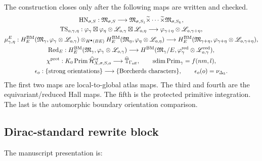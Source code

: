 The construction closes only after the following maps are written and
checked.
\[
\begin{gathered}
  \mathrm{HN}_{\sigma,S}:
  \mathfrak M_{\sigma,S}
  \longrightarrow
  \mathfrak M_{\sigma,S_1}\widetilde{\times}\cdots
  \widetilde{\times}\mathfrak M_{\sigma,S_k},\\
  \mathrm{TS}_{o,\gamma,\eta}:
  \varphi_{\gamma}\boxtimes\varphi_{\eta}\otimes
  \mathscr L_{o,\gamma}\boxtimes\mathscr L_{o,\eta}
  \longrightarrow
  \varphi_{\gamma+\eta}\otimes\mathscr L_{o,\gamma+\eta},\\
  \mu^{E}_{\gamma,\eta}:
  H^{\operatorname{BM}}_{E}(\mathfrak M_\gamma,\varphi_\gamma\otimes\mathscr L_{o,\gamma})
  \otimes_{H^\bullet(BE)}
  H^{\operatorname{BM}}_{E}(\mathfrak M_\eta,\varphi_\eta\otimes\mathscr L_{o,\eta})
  \longrightarrow
  H^{\operatorname{BM}}_{E}(\mathfrak M_{\gamma+\eta},
  \varphi_{\gamma+\eta}\otimes\mathscr L_{o,\gamma+\eta}),\\
  \mathrm{Red}_E:
  H^{\operatorname{BM}}_{E}(\mathfrak M_\gamma,\varphi_\gamma\otimes\mathscr L_{o,\gamma})
  \longrightarrow
  H^{\operatorname{BM}}(\mathfrak M_\gamma/E,
  \varphi_\gamma^{\mathrm{red}}\otimes\mathscr L_{o,\gamma}^{\mathrm{red}}),\\
  \chi^{\mathrm{prot}}:
  K_0\operatorname{Prim}
  \widehat{\mathcal H}^{\mathrm{or}}_{X,\sigma,S,o}
  \longrightarrow
  \widehat{\mathbb T}_{\Gamma_{\mathrm{eff}}},
  \qquad
  \operatorname{sdim}\operatorname{Prim}_\gamma=f(nm,l),\\
  \epsilon_o:\{\hbox{strong orientations}\}\longrightarrow
  \{\hbox{Borcherds characters}\},
  \qquad
  \epsilon_o(o)=\nu_{\Delta_5}.
\end{gathered}
\]
The first two maps are local-to-global atlas maps.  The third and
fourth are the equivariant/reduced Hall maps.  The fifth is the
protected primitive integration.  The last is the automorphic boundary
orientation comparison.

\subsection{Dirac-standard rewrite block}

The manuscript presentation is:

